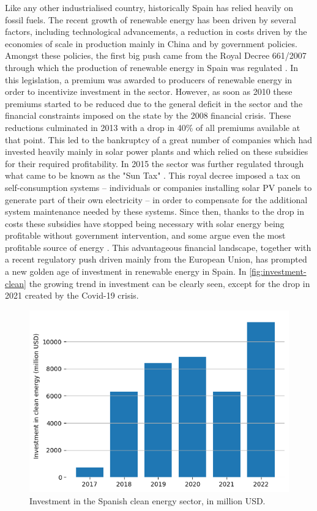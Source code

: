 Like any other industrialised country, historically Spain has relied heavily on fossil fuels. The recent growth of renewable energy has been driven by several factors, including technological advancements, a reduction in costs driven by the economies of scale in production mainly in China and by government policies. Amongst these policies, the first big push came from the Royal Decree 661/2007 through which the production of renewable energy in Spain was regulated \cite{boe_661_2007}. In this legislation, a premium was awarded to producers of renewable energy in order to incentivize investment in the sector. However, as soon as 2010 these premiums started to be reduced due to the general deficit in the sector and the financial constraints imposed on the state by the 2008 financial crisis. These reductions culminated in 2013 with a drop in 40\% of all premiums available at that point. This led to the bankruptcy of a great number of companies which had invested heavily mainly in solar power plants and which relied on these subsidies for their required profitability. In 2015 the sector was further regulated through what came to be known as the "Sun Tax" \cite{boe_900_2015}. This royal decree imposed a tax on self-consumption systems -- individuals or companies installing solar PV panels to generate part of their own electricity -- in order to compensate for the additional system maintenance needed by these systems. Since then, thanks to the drop in costs these subsidies have stopped being necessary with solar energy being profitable without government intervention, and some argue even the most profitable source of energy \cite{gunther_glenk_reichelstein_2022}. This advantageous financial landscape, together with a recent regulatory push driven mainly from the European Union, has prompted a new golden age of investment in renewable energy in Spain. In \autoref{fig:investment-clean} the growing trend in investment can be clearly seen, except for the drop in 2021 created by the Covid-19 crisis. 

\begin{figure}[ht]
    \centering
    \captionsetup{justification=centering}
    \includegraphics[width=0.7\linewidth]{assets/investment-clean.png}
    \caption{Investment in the Spanish clean energy sector, in million USD. \cite{renewable_energy_investments_2022}}
    \label{fig:investment-clean}
\end{figure}

